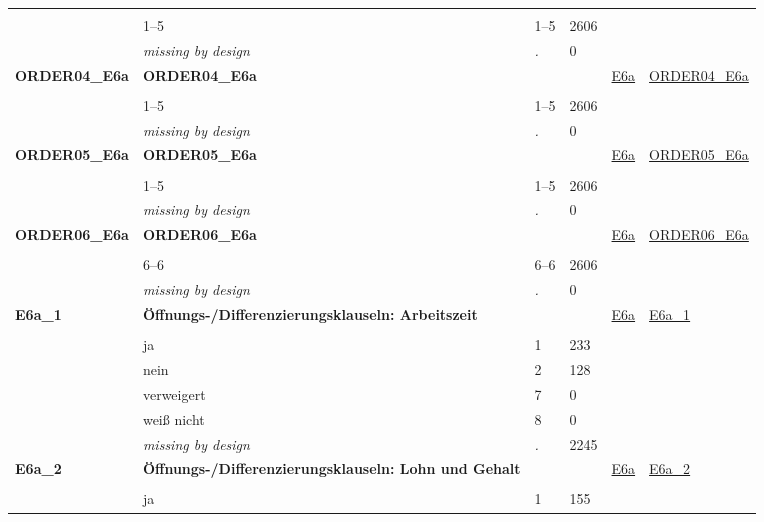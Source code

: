 \begin{longtable}{| L{2.45cm} | L{6cm} | C{1.5cm} | R{1cm} | C{2.25cm} | C{2.25cm} |}
   &  &  &  &  &  \\ 
   & 1--5 & 1--5 & 2606 &  &  \\ 
   & \textit{missing by design} & \textit{.} & 0 &  &  \\ 
   \midrule
\textbf{ORDER04\_E6a}\label{var:ORDER04:E6a} & \textbf{ORDER04\_E6a} &  &  & \hyperref[E6a]{E6a} & \hyperref[var:suf:ORDER04:E6a]{ORDER04\_E6a} \\ 
   &  &  &  &  &  \\ 
   & 1--5 & 1--5 & 2606 &  &  \\ 
   & \textit{missing by design} & \textit{.} & 0 &  &  \\ 
   \midrule
\textbf{ORDER05\_E6a}\label{var:ORDER05:E6a} & \textbf{ORDER05\_E6a} &  &  & \hyperref[E6a]{E6a} & \hyperref[var:suf:ORDER05:E6a]{ORDER05\_E6a} \\ 
   &  &  &  &  &  \\ 
   & 1--5 & 1--5 & 2606 &  &  \\ 
   & \textit{missing by design} & \textit{.} & 0 &  &  \\ 
   \midrule
\textbf{ORDER06\_E6a}\label{var:ORDER06:E6a} & \textbf{ORDER06\_E6a} &  &  & \hyperref[E6a]{E6a} & \hyperref[var:suf:ORDER06:E6a]{ORDER06\_E6a} \\ 
   &  &  &  &  &  \\ 
   & 6--6 & 6--6 & 2606 &  &  \\ 
   & \textit{missing by design} & \textit{.} & 0 &  &  \\ 
   \midrule
\textbf{E6a\_1}\label{var:E6a:1} & \textbf{Öffnungs-/Differenzierungsklauseln: Arbeitszeit} &  &  & \hyperref[E6a]{E6a} & \hyperref[var:suf:E6a:1]{E6a\_1} \\ 
   &  &  &  &  &  \\ 
   & ja & 1 & 233 &  &  \\ 
   & nein & 2 & 128 &  &  \\ 
   & verweigert & 7 & 0 &  &  \\ 
   & weiß nicht & 8 & 0 &  &  \\ 
   & \textit{missing by design} & \textit{.} & 2245 &  &  \\ 
   \midrule
\textbf{E6a\_2}\label{var:E6a:2} & \textbf{Öffnungs-/Differenzierungsklauseln: Lohn und Gehalt} &  &  & \hyperref[E6a]{E6a} & \hyperref[var:suf:E6a:2]{E6a\_2} \\ 
   &  &  &  &  &  \\ 
   & ja & 1 & 155 &  &  \\ 

\end{longtable}
